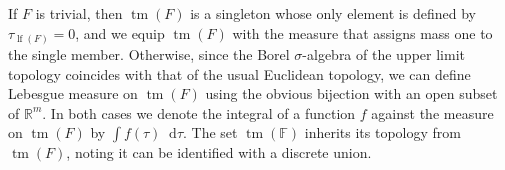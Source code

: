 \documentclass[reqno,draft]{amsart}
\numberwithin{equation}{section}
\theoremstyle{plain}
\newtheorem{lemma}[theorem]{Lemma}
\theoremstyle{remark}
\newcommand{\R}{\mathbb{R}} %
\renewcommand{\P}{\mathbb{P}} %
\newcommand*\diff{\mathop{}\!\mathrm{d}}
\newcommand{\fpart}{\Pi} %
\newcommand{\rates}{R^\circ} %
\DeclareMathOperator{\lf}{lf}
\DeclareMathOperator{\rt}{rt}
\DeclareMathOperator{\dct}{tm}
\DeclareMathOperator{\fr}{Fr}
\DeclareMathOperator{\tm}{Tm}
\newcommand{\ftm}{f_\mathrm{tm}^{\boldsymbol \lambda}}
\begin{document}
If $F$ is trivial, then $\dct(F)$ is a singleton whose only element is defined by $\tau_{\lf(F)} = 0$, and we equip $\dct(F)$ with the measure that assigns mass one to the single member.
Otherwise, since the Borel $\sigma$-algebra of the upper limit topology coincides with that of the usual Euclidean topology, we can define Lebesgue measure on $\dct(F)$ using the obvious bijection with an open subset of $\R^m$. In both cases we denote the integral of a function $f$ against the measure on $\dct(F)$ by $\int f(\tau)\diff \tau$. The set $\dct(\mathbb{F})$ inherits its topology from $\dct(F)$, noting it can be identified with a discrete union.

\end{document}
